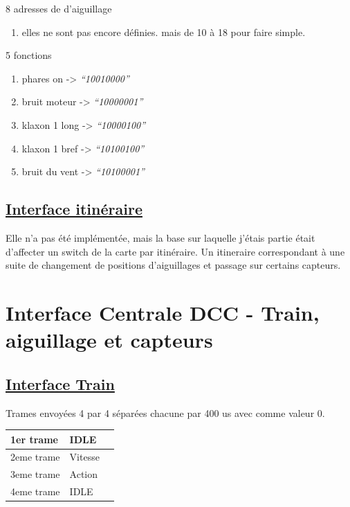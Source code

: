 \bigskip

8 adresses de d'aiguillage
\begin {enumerate}
\item elles ne sont pas encore définies. mais de 10 à 18 pour faire simple.
\end {enumerate}  

\bigskip

5 fonctions
\begin {enumerate}
\item phares on     -> \emph{``10010000''}
\item bruit moteur  -> \emph{``10000001''}
\item klaxon 1 long -> \emph{``10000100''}
\item klaxon 1 bref -> \emph{``10100100''}
\item bruit du vent -> \emph{``10100001''}
\end {enumerate}  

\bigskip

\subsection{\underline{Interface itinéraire}}
\label{sec:ihm_iti}

Elle n'a pas été implémentée, mais la base sur laquelle j'étais partie
\'etait d'affecter un switch de la carte par itinéraire.
Un itineraire correspondant à une suite de changement de positions
d'aiguillages et passage sur certains capteurs.

\newpage

\section{Interface Centrale DCC - Train, aiguillage et capteurs}
\label{sec:int_dcc}

\subsection{\underline{Interface Train}}
\label{sec:int_train}

\bigskip
Trames envoyées 4 par 4 séparées chacune par 400 us avec comme valeur 0.
\begin{center}
\begin{tabular}{|l|l|l|}
  \hline
  1er trame & IDLE \\
  \hline
  2eme trame & Vitesse \\
  \hline
  3eme trame & Action \\
  \hline
  4eme trame & IDLE \\
  \hline
\end{tabular}
\end{center}

